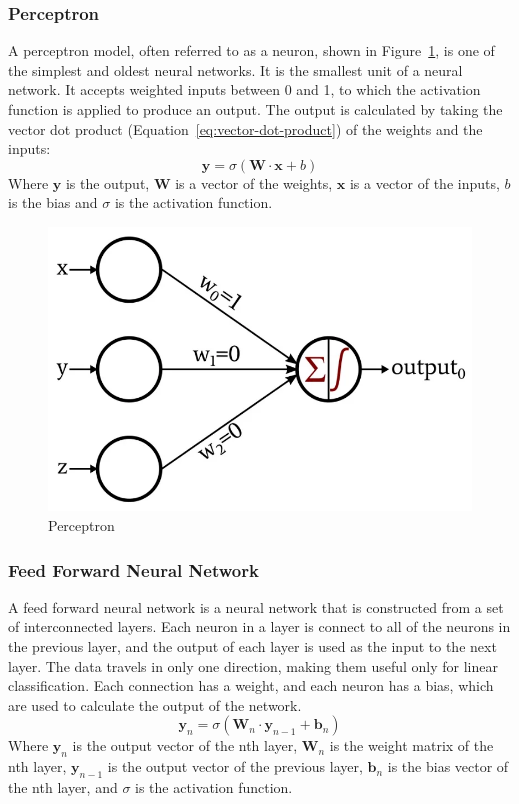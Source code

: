 \documentclass[titlepage]{article}
\begin{document}
\subsubsection{Perceptron}
A perceptron model, often referred to as a neuron, shown in Figure~\ref{fig:perceptron}, is one of the simplest and oldest neural networks. It is the smallest unit of a neural network. It accepts weighted inputs between 0 and 1, to which the activation function is applied to produce an output. The output is calculated by taking the vector dot product (Equation~\ref{eq:vector-dot-product}) of the weights and the inputs:
\begin{equation}
    \textbf{y} = \sigma(\textbf{W}\cdot\textbf{x} + b)
    \label{eq:perceptron}
\end{equation}
Where $\textbf{y}$ is the output, $\textbf{W}$ is a vector of the weights, $\textbf{x}$ is a vector of the inputs, $b$ is the bias and $\sigma$ is the activation function.

\begin{figure}[h!]
    \includegraphics[width=\textwidth]{./assets/perceptron.png}
    \caption{Perceptron}
    \label{fig:perceptron}
\end{figure}

\subsubsection{Feed Forward Neural Network}
A feed forward neural network is a neural network that is constructed from a set of interconnected layers. Each neuron in a layer is connect to all of the neurons in the previous layer, and the output of each layer is used as the input to the next layer. The data travels in only one direction, making them useful only for linear classification. Each connection has a weight, and each neuron has a bias, which are used to calculate the output of the network.
\begin{equation}
    \textbf{y}_n=\sigma{(\textbf{W}_n\cdot\textbf{y}_{n-1} + \textbf{b}_n)}
    \label{eq:feed-forward}
\end{equation}
Where $\textbf{y}_n$ is the output vector of the nth layer, $\textbf{W}_n$ is the weight matrix of the nth layer, $\textbf{y}_{n-1}$ is the output vector of the previous layer, $\textbf{b}_n$ is the bias vector of the nth layer, and $\sigma$ is the activation function.
\end{document}
